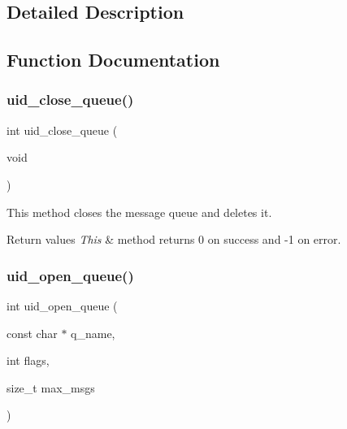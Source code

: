 \subsection{Detailed Description}


\subsection{Function Documentation}
\mbox{\label{group__libmisc__fb__mw_gad090bd08bb16286d82e213d424e561ff}} 
\subsubsection{\texorpdfstring{uid\_close\_queue()}{uid\_close\_queue()}}
{\footnotesize\ttfamily int uid\+\_\+close\+\_\+queue (\begin{DoxyParamCaption}\item[{void}]{ }\end{DoxyParamCaption})}

This method closes the message queue and deletes it.


\begin{DoxyRetVals}{Return values}
{\em This} & method returns 0 on success and -\/1 on error. \\
\hline
\end{DoxyRetVals}
\mbox{\label{group__libmisc__fb__mw_ga36e445e26f099ddfd3a06d9321d3b409}} 
\subsubsection{\texorpdfstring{uid\_open\_queue()}{uid\_open\_queue()}}
{\footnotesize\ttfamily int uid\+\_\+open\+\_\+queue (\begin{DoxyParamCaption}\item[{const char $\ast$}]{q\+\_\+name,  }\item[{int}]{flags,  }\item[{size\+\_\+t}]{max\+\_\+msgs }\end{DoxyParamCaption})}

